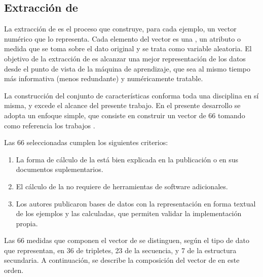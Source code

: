 %
%
\subsection{Extracción de }
%
La extracción de  es el proceso que construye, para cada
ejemplo, un vector numérico que lo representa.
Cada elemento del vector es una \e{\caract{}}, un atributo o medida
que se toma sobre el dato original y se trata como variable aleatoria.
El objetivo de la extracción de  es alcanzar una mejor
representación de los datos desde el punto de vista de la máquina de
aprendizaje, que sea al mismo tiempo más informativa (menos
redundante) y numéricamente tratable.

La construcción del conjunto de características conforma toda una
disciplina en sí misma, y excede el alcance del presente trabajo.
En el presente desarrollo se adopta un enfoque simple, que consiste en
construir un vector de 66  tomando como referencia los
trabajos \cite{xue,ng,batuwita}.

Las 66  seleccionadas cumplen los siguientes criterios:
%
\begin{enumerate}
\item
  La forma de cálculo de la \caract{} está bien explicada en la
  publicación o en sus documentos suplementarios.
\item
  El cálculo de la \caract{} no requiere de herramientas de software
  adicionales.
\item
  Los autores publicaron bases de datos con la representación en forma
  textual de los ejemplos y las  calculadas, que permiten
  validar la implementación propia.
\end{enumerate}
%

Las 66 medidas que componen el vector de  se distinguen,
según el tipo de dato que representan, en 36  de tripletes,
23  de la secuencia, y 7 de la estructura secundaria.
A continuación, se describe la composición del vector de 
en este orden.
